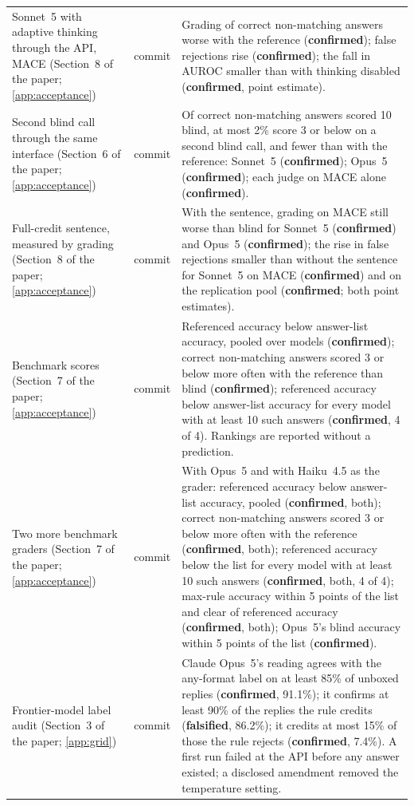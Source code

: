 {\begin{longtable}{L{3.2cm}L{1.1cm}L{8.7cm}}
Sonnet~5 with adaptive thinking through the API, \textsc{MACE} (Section~8 of the paper; \cref{app:acceptance}) & commit & Grading of correct non-matching answers worse with the reference (\textbf{confirmed}); false rejections rise (\textbf{confirmed}); the fall in AUROC smaller than with thinking disabled (\textbf{confirmed}, point estimate). \\
Second blind call through the same interface (Section~6 of the paper; \cref{app:acceptance}) & commit & Of correct non-matching answers scored 10 blind, at most 2\% score 3 or below on a second blind call, and fewer than with the reference: Sonnet~5 (\textbf{confirmed}); Opus~5 (\textbf{confirmed}); each judge on \textsc{MACE} alone (\textbf{confirmed}). \\
Full-credit sentence, measured by grading (Section~8 of the paper; \cref{app:acceptance}) & commit & With the sentence, grading on \textsc{MACE} still worse than blind for Sonnet~5 (\textbf{confirmed}) and Opus~5 (\textbf{confirmed}); the rise in false rejections smaller than without the sentence for Sonnet~5 on \textsc{MACE} (\textbf{confirmed}) and on the replication pool (\textbf{confirmed}; both point estimates). \\
Benchmark scores (Section~7 of the paper; \cref{app:acceptance}) & commit & Referenced accuracy below answer-list accuracy, pooled over models (\textbf{confirmed}); correct non-matching answers scored 3 or below more often with the reference than blind (\textbf{confirmed}); referenced accuracy below answer-list accuracy for every model with at least 10 such answers (\textbf{confirmed}, 4 of 4). Rankings are reported without a prediction. \\
Two more benchmark graders (Section~7 of the paper; \cref{app:acceptance}) & commit & With Opus~5 and with Haiku~4.5 as the grader: referenced accuracy below answer-list accuracy, pooled (\textbf{confirmed}, both); correct non-matching answers scored 3 or below more often with the reference (\textbf{confirmed}, both); referenced accuracy below the list for every model with at least 10 such answers (\textbf{confirmed}, both, 4 of 4); max-rule accuracy within 5 points of the list and clear of referenced accuracy (\textbf{confirmed}, both); Opus~5's blind accuracy within 5 points of the list (\textbf{confirmed}). \\
Frontier-model label audit (Section~3 of the paper; \cref{app:grid}) & commit & Claude Opus~5's reading agrees with the any-format label on at least 85\% of unboxed replies (\textbf{confirmed}, 91.1\%); it confirms at least 90\% of the replies the rule credits (\textbf{falsified}, 86.2\%); it credits at most 15\% of those the rule rejects (\textbf{confirmed}, 7.4\%). A first run failed at the API before any answer existed; a disclosed amendment removed the temperature setting. \\

\end{longtable}}

